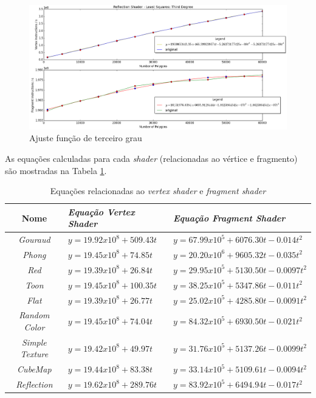 	\begin{figure}[h]
	\centering
		\includegraphics[keepaspectratio=true,scale=0.4]{figuras/reflectionthird.png}
	\caption{Ajuste função de terceiro grau}
	\label{third}
	\end{figure}	

	As equações calculadas para cada \textit{shader} (relacionadas ao vértice e fragmento) são mostradas na Tabela \ref{equacoes}.


	\begin{table}[h]
	\centering	
	\begin{tabularx}{0.9\textwidth}{cXX}
		\toprule
		\textbf{Nome} & \textbf{\textit{Equação Vertex Shader}} & \textbf{\textit{Equação Fragment Shader}}  \\
		\midrule
		\textit{Gouraud} & $y = 19.92 x 10^8 + 509.43t$ & $y = 67.99 x 10 ^5 + 6076.30t - 0.014t^2$ \\
		\textit{Phong} &  $y = 19.45 x 10^8 + 74.85t$ & $y = 20.20 x 10^6 + 9605.32t - 0.035t^2$\\
		\textit{Red} & $y = 19.39 x 10^8 + 26.84t$ & $y = 29.95 x 10 ^5 + 5130.50t - 0.0097t^2$ \\
		\textit{Toon} & $y = 19.45 x 10^8 + 100.35t$ & $y = 38.25 x 10 ^5 + 5347.86t - 0.011t^2$ \\
		\textit{Flat} & $y = 19.39 x 10^8 + 26.77t$ & $y = 25.02 x 10 ^5 + 4285.80t - 0.0091t^2$ \\
		\textit{Random Color} & $y = 19.45 x 10^8 + 74.04t$ & $y = 84.32 x 10 ^5 + 6930.50t - 0.021t^2$ \\
		\textit{Simple Texture} & $y = 19.42 x 10^8 + 49.97t$ & $y = 31.76 x 10 ^5 + 5137.26t - 0.0099t^2$ \\
		\textit{CubeMap} & $y = 19.44 x 10^8 + 83.38t$ & $y = 33.14 x 10 ^5 + 5109.61t - 0.0094t^2$ \\
		\textit{Reflection} & $y = 19.62 x 10^8 + 289.76t$ & $y = 83.92 x 10 ^5 + 6494.94t - 0.017t^2$ \\
	
		\bottomrule
	\end{tabularx}
	\caption{Equações relacionadas ao \textit{vertex shader} e \textit{fragment shader}}
	\label{equacoes}
	\end{table}
